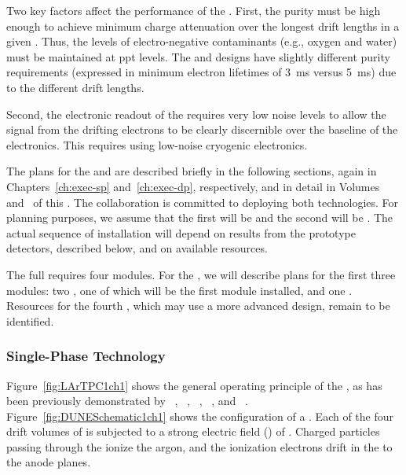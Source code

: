 Two key factors affect the performance of the  .  First, the  purity must be high enough to achieve minimum charge attenuation over the longest drift lengths in a given .  Thus, the levels of electro-negative contaminants (e.g., oxygen and water) must be maintained at ppt levels.  The  and  designs have slightly different purity requirements (expressed in minimum electron lifetimes of \SI{3}{ms} versus \SI{5}{ms}) due to the different drift lengths.

Second, the electronic readout of the  requires very low noise levels to allow the signal from the drifting electrons to be clearly discernible over the baseline of the electronics.  This requires using low-noise cryogenic electronics. 

The plans for the  and   are described briefly in the following sections, again in Chapters~\ref{ch:exec-sp} and~\ref{ch:exec-dp}, respectively, and in detail in Volumes~\volnumbersp{} and~\volnumberdp{} of this . 
The  collaboration is committed to deploying both technologies. 
For planning purposes, we assume that the first  will be
 and the second will be .
The actual sequence of  installation will depend on results from the prototype detectors, described below, and on available resources.

The full   requires four modules. For the , we will describe plans for the first three modules: two , one of which will be the first module installed, and one . Resources for the fourth , which may use a more advanced design, remain to be identified. 

\subsubsection{Single-Phase Technology}
\label{sec:fdsp-exec-splar}

Figure~\ref{fig:LArTPC1ch1} shows the general operating principle of the  , as has been previously demonstrated by  ~\cite{Icarus-T600}, ~\cite{microboone}, ~\cite{Anderson:2012vc}, ~\cite{Cavanna:2014iqa}, and ~\cite{Abi:2017aow}. Figure~\ref{fig:DUNESchematic1ch1} shows the configuration of a  . Each of the four drift volumes of  is subjected to a strong electric field (\efield{}) of \spmaxfield. Charged particles passing through the  ionize the argon, and the ionization electrons drift in the \efield to the anode planes. 


